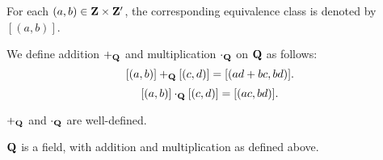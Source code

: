\begin{notation}
For each $(a,b)\in\mathbf Z\times\mathbf Z^\prime$, the corresponding equivalence class is denoted by $[(a,b)]$.
\end{notation}

We define addition $+_\mathbf Q$ and multiplication $\cdot_\mathbf Q$ on $\mathbf Q$ as follows:
\[[(a,b)]+_\mathbf Q[(c,d)]=[(ad+bc,bd)].\]
\[[(a,b)]\cdot_\mathbf Q[(c,d)]=[(ac,bd)].\]

\begin{proposition}
$+_\mathbf Q$ and $\cdot_\mathbf Q$ are well-defined.
\end{proposition}

\begin{lemma}
$\mathbf Q$ is a field, with addition and multiplication as defined above.
\end{lemma}

